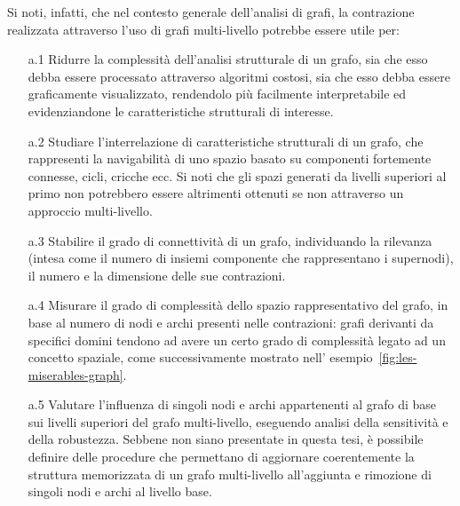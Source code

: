 Si noti, infatti, che nel contesto generale dell'analisi di grafi, la contrazione realizzata attraverso
l'uso di grafi multi-livello potrebbe essere utile per:
\begin{itemize}
    \item[a.1] Ridurre la complessit\`a dell'analisi strutturale di un grafo, sia che esso debba essere processato
    attraverso algoritmi costosi, sia che esso debba essere graficamente visualizzato, rendendolo pi\`u facilmente
    interpretabile ed evidenziandone le caratteristiche strutturali di interesse.
    \item[a.2] Studiare l'interrelazione di caratteristiche strutturali di un grafo, che rappresenti la navigabilit\`a
    di uno spazio basato su componenti fortemente connesse, cicli, cricche ecc.
    Si noti che gli spazi generati da livelli superiori al primo non potrebbero essere altrimenti ottenuti se
    non attraverso un approccio multi-livello.
    \item[a.3] Stabilire il grado di connettivit\`a di un grafo, individuando la rilevanza (intesa come il numero di
    insiemi componente che rappresentano i supernodi), il numero e la dimensione delle sue contrazioni.
    \item[a.4] Misurare il grado di complessit\`a dello spazio rappresentativo del grafo, in base al numero
    di nodi e archi presenti nelle contrazioni: grafi derivanti da specifici domini tendono ad avere un certo
    grado di complessit\`a legato ad un concetto spaziale, come successivamente mostrato nell'
    esempio~\ref{fig:les-miserables-graph}.
    \item[a.5] Valutare l'influenza di singoli nodi e archi appartenenti al grafo di base sui livelli superiori
    del grafo multi-livello, eseguendo analisi della sensitivit\`a e della robustezza.
    Sebbene non siano presentate in questa tesi, è possibile definire delle procedure che permettano di aggiornare
    coerentemente la struttura memorizzata di un grafo multi-livello all'aggiunta e rimozione di singoli nodi e
    archi al livello base.
\end{itemize}

